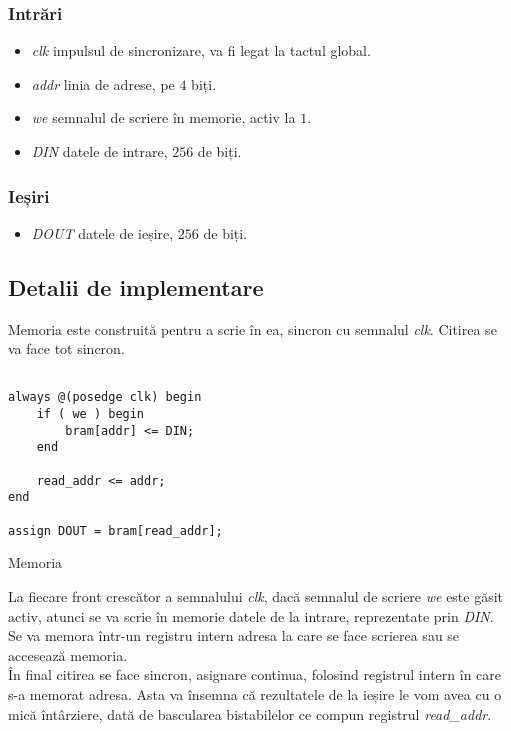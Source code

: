 \documentclass[12pt,twoside,a4paper,fleqn]{book}
\theoremstyle{definition}
\begin{document}
\subsubsection{Intrări}
\begin{itemize}
\item \emph{clk} impulsul de sincronizare, va fi legat la tactul global.
\item \emph{addr} linia de adrese, pe $4$ biți.
\item \emph{we} semnalul de scriere în memorie, activ la $1$.
\item \emph{DIN} datele de intrare, $256$ de biți.
\end{itemize}

\subsubsection{Ieșiri}
\begin{itemize}
\item \emph{DOUT} datele de ieșire, $256$ de biți.
\end{itemize}

\subsection{Detalii de implementare}
Memoria este construită pentru a scrie în ea, sincron cu semnalul \emph{clk}. Citirea se va face tot sincron.
\begin{fragmentsursa}
\begin{scriptsize}
\begin{verbatim}

always @(posedge clk) begin
    if ( we ) begin
        bram[addr] <= DIN;
    end

    read_addr <= addr;	 
end
	 
assign DOUT = bram[read_addr];
\end{verbatim}
\end{scriptsize}
\caption{Memoria}
\label{frag_bram}
\end{fragmentsursa}
La fiecare front crescător a semnalului \emph{clk}, dacă semnalul de scriere \emph{we} este găsit activ, atunci se va scrie în memorie datele de la intrare, reprezentate prin \emph{DIN}. Se va memora într-un registru intern adresa la care se face scrierea sau se accesează memoria.\\
În final citirea se face sincron, asignare continua, folosind registrul intern în care s-a memorat adresa. Asta va însemna că rezultatele de la ieșire le vom avea cu o mică întârziere, dată de bascularea bistabilelor ce compun registrul \emph{read\_addr}.
\end{document}
